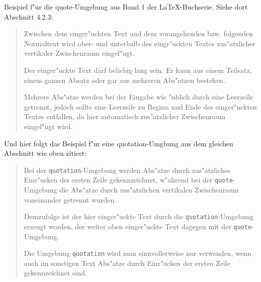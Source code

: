 \documentclass{article}
\begin{document}
Beispiel f"ur die quote-Umgebung aus Band 1 der \LaTeX-Buchserie. Siehe
dort Abschnitt 4.2.3:
\begin{quote}
Zwischen dem einger"uckten Text und dem vorangehenden bzw. folgenden
Normaltext wird ober- und unterhalb des eingr"uckten Textes zus"atzlicher
vertikaler Zwischenraum eingef"ugt.

Der einger"uckte Text darf beliebig lang sein. Er kann aus einem Teilsatz,
einem ganzen Absatz oder gar aus mehreren Abs"atzen bestehen.

Mehrere Abs"atze werden bei der Eingabe wie "ublich durch eine Leerzeile
getrennt, jedoch sollte eine Leerzeile zu Beginn und Ende des einger"uckten
Textes entfallen, da hier automatisch zus"atzlicher Zwischenraum eingef"ugt
wird.
\end{quote}

Und hier folgt das Beispiel f"ur eine quotation-Umgbung aus dem gleichen
Abschnitt wie oben zitiert:
\begin{quotation}
Bei der \texttt{quotation}-Umgebung werden Abs"atze durch zus"atzliches
Einr"ucken der ersten Zeile gekennzeichnet, w"ahrend bei der 
\texttt{quote}-Umgebung die Abs"atze durch zus"atzlichen vertikalen
Zwischenraum voneinander getrennt wurden.

Demzufolge ist der hier einger"uckte Text durch die 
\texttt{quotation}-Umgebung erzeugt worden, der weiter oben einger"uckte
Text dagegen mit der \texttt{quote}-Umgebung.

Die Umgebung \texttt{quotation} wird man sinnvollerweise nur verwenden,
wenn auch im sonstigen Text Abs"atze durch Einr"ucken der ersten Zeile
gekennzeichnet sind.
\end{quotation}
\end{document}
